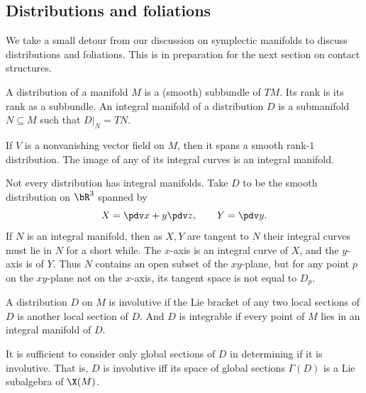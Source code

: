 \subsection{Distributions and foliations}

We take a small detour from our discussion on symplectic manifolds to discuss distributions and foliations.
This is in preparation for the next section on contact structures.

\bdefn

    A {\emphcolor distribution} of a manifold $M$ is a (smooth) subbundle of $TM$.
    Its rank is its rank as a subbundle.
    An {\emphcolor integral manifold} of a distribution $D$ is a submanifold $N\subseteq M$ such that $D|_N=TN$.

\edefn

\bexam

    If $V$ is a nonvanishing vector field on $M$, then it spans a smooth rank-$1$ distribution.
    The image of any of its integral curves is an integral manifold.

\eexam

\bexam

    Not every distribution has integral manifolds.
    Take $D$ to be the smooth distribution on $\bR^3$ spanned by
    $$ X = \pdv x + y\pdv z,\qquad Y = \pdv y . $$
    If $N$ is an integral manifold, then as $X,Y$ are tangent to $N$ their integral curves must lie in $N$ for a short while.
    The $x$-axis is an integral curve of $X$, and the $y$-axis is of $Y$.
    Thus $N$ contains an open subset of the $xy$-plane, but for any point $p$ on the $xy$-plane not on the $x$-axis, its tangent space
    is not equal to $D_p$.

\eexam

\bdefn

    A distribution $D$ on $M$ is {\emphcolor involutive} if the Lie bracket of any two local sections of $D$ is another local section of $D$.
    And $D$ is {\emphcolor integrable} if every point of $M$ lies in an integral manifold of $D$.

\edefn

\bremark[name={involutiveglobal}]

    It is sufficient to consider only global sections of $D$ in determining if it is involutive.
    That is, $D$ is involutive iff its space of global sections $\Gamma(D)$ is a Lie subalgebra of $\X(M)$.

